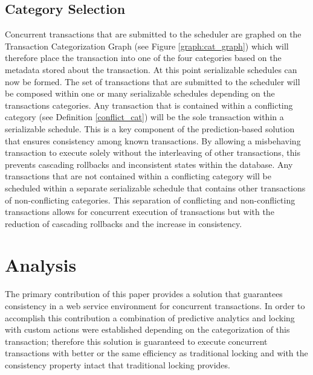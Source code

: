 \documentclass[conference]{IEEEtran}
\newtheorem{example}{Example}[definition]
\begin{document}
 
  
 
 
\subsection{Category Selection}
 Concurrent transactions that are submitted to the scheduler are graphed on the Transaction Categorization Graph (see Figure \ref{graph:cat_graph}) which will therefore place the transaction into one of the four categories based on the metadata stored about the transaction. At this point serializable schedules can now be formed. The set of transactions that are submitted to the scheduler will be composed within one or many serializable schedules depending on the transactions categories. Any transaction that is contained within a conflicting category (see Definition \ref{conflict_cat}) will be the sole transaction within a serializable schedule. This is a key component of the prediction-based solution that ensures consistency among known transactions. By allowing a misbehaving transaction to execute solely without the interleaving of other transactions, this prevents cascading rollbacks and inconsistent states within the database. Any transactions that are not contained within a conflicting category will be scheduled within a separate serializable schedule that contains other transactions of non-conflicting categories. This separation of conflicting and non-conflicting transactions allows for concurrent execution of transactions but with the reduction of cascading rollbacks and the increase in consistency.

\section{Analysis}
The primary contribution of this paper provides a solution that guarantees consistency in a web service environment for concurrent transactions. In order to accomplish this contribution a combination of predictive analytics and locking with custom actions were established depending on the categorization of this transaction; therefore this solution is guaranteed to execute concurrent transactions with better or the same efficiency as traditional locking and with the consistency property intact that traditional locking provides.
\end{document}
